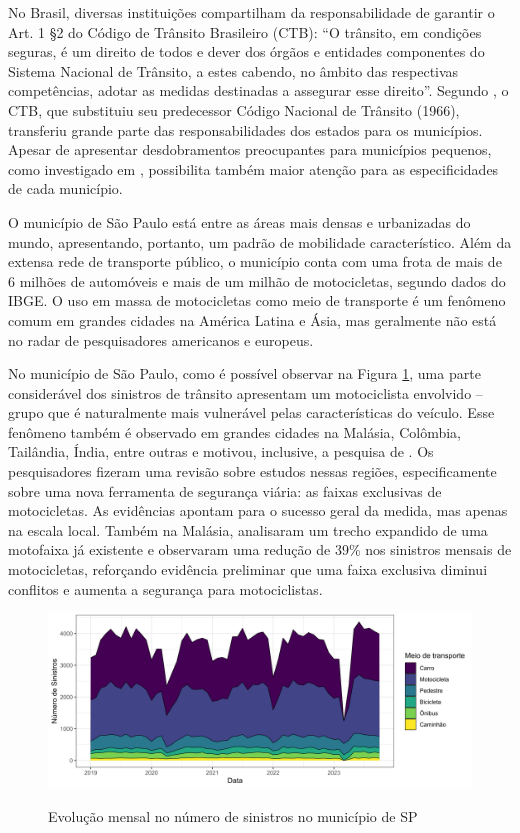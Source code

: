 No Brasil, diversas instituições compartilham da responsabilidade de garantir o Art. 1 \S 2 do Código de Trânsito Brasileiro (CTB): ``O trânsito, em condições seguras, é um direito de todos e dever dos órgãos e entidades componentes do Sistema Nacional de Trânsito, a estes cabendo, no âmbito das respectivas competências, adotar as medidas destinadas a assegurar esse direito''. Segundo \textcite{vasconcellos2005cidade}, o CTB, que substituiu seu predecessor Código Nacional de Trânsito (1966), transferiu grande parte das responsabilidades dos estados para os municípios. Apesar de apresentar desdobramentos preocupantes para municípios pequenos, como investigado em \textcite{bavoso2014sistema}, possibilita também maior atenção para as especificidades de cada município.

O município de São Paulo está entre as áreas mais densas e urbanizadas do mundo, apresentando, portanto, um padrão de mobilidade característico. Além da extensa rede de transporte público, o município conta com uma frota de mais de 6 milhões de automóveis e mais de um milhão de motocicletas, segundo dados do IBGE. O uso em massa de motocicletas como meio de transporte é um fenômeno comum em grandes cidades na América Latina e Ásia, mas geralmente não está no radar de pesquisadores americanos e europeus. 

No município de São Paulo, como é possível observar na Figura \ref{fig:sinistros}, uma parte considerável dos sinistros de trânsito apresentam um motociclista envolvido -- grupo que é naturalmente mais vulnerável pelas características do veículo. Esse fenômeno também é observado em grandes cidades na Malásia, Colômbia, Tailândia, Índia, entre outras e motivou, inclusive, a pesquisa de \textcite{saini2022exclusive}. Os pesquisadores fizeram uma revisão sobre estudos nessas regiões, especificamente sobre uma nova ferramenta de segurança viária: as faixas exclusivas de motocicletas. As evidências apontam para o sucesso geral da medida, mas apenas na escala local. Também na Malásia, \textcite{RadinSohadi_Mackay_Hills_2000} analisaram um trecho expandido de uma motofaixa já existente e observaram uma redução de 39\% nos sinistros mensais de motocicletas, reforçando evidência preliminar que uma faixa exclusiva diminui conflitos e aumenta a segurança para motociclistas.

\begin{figure}[h]
    \centering
    \caption{Evolução mensal no número de sinistros no município de SP}
    \includegraphics[width = 1\linewidth]{relatorios/faixa-azul/figuras/sinistros_sp.png}
    \label{fig:sinistros}
\end{figure}

